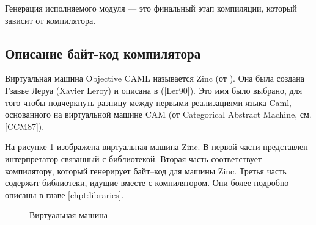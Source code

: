Генерация исполняемого модуля --- это финальный этап компиляции, который зависит
от компилятора.

\subsection {Описание байт-код компилятора}

Виртуальная машина Objective CAML называется Zinc (от ).
Она была создана Гзавье Леруа (Xavier Leroy) и описана в ([Ler90]). Это имя было
выбрано, для того чтобы подчеркнуть разницу между первыми реализациями языка
Caml, основанного на виртуальной машине CAM (от Categorical Abstract Machine,
см. [CCM87]).

На рисунке \ref{fig:virtual_machine} изображена виртуальная машина Zinc. В
первой части представлен интерпретатор связанный с библиотекой. Вторая часть
соответствует компилятору, который генерирует байт–код для машины Zinc. Третья
часть содержит библиотеки, идущие вместе с компилятором. Они более подробно
описаны в главе \ref{chpt:libraries}.

\begin{figure}[h]
	\caption{\label{fig:virtual_machine}Виртуальная машина}
\end{figure}

